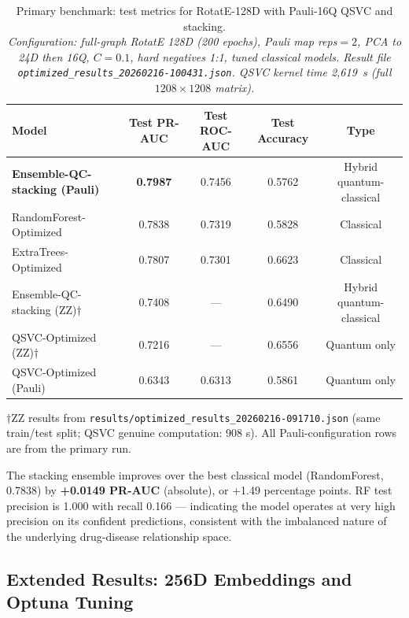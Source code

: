 \documentclass[twocolumn,10pt]{article}
\begin{document}
\begin{table}[t]
\centering
\caption{Primary benchmark: test metrics for RotatE-128D with Pauli-16Q QSVC and stacking.\protect\\
\small\textit{Configuration: full-graph RotatE 128D (200 epochs), Pauli map reps${=}2$, PCA to 24D then 16Q, $C{=}0.1$, hard negatives 1:1, tuned classical models. Result file \texttt{optimized\_results\_20260216-100431.json}. QSVC kernel time 2,619~s (full $1208{\times}1208$ matrix).}}
\label{tab:primary}
\begin{tabular}{@{}lcccc@{}}
\toprule
\textbf{Model} & \textbf{Test PR-AUC} & \textbf{Test ROC-AUC} & \textbf{Test Accuracy} & \textbf{Type} \\
\midrule
\textbf{Ensemble-QC-stacking (Pauli)} & \textbf{0.7987} & 0.7456 & 0.5762 & Hybrid quantum-classical \\
RandomForest-Optimized & 0.7838 & 0.7319 & 0.5828 & Classical \\
ExtraTrees-Optimized & 0.7807 & 0.7301 & 0.6623 & Classical \\
Ensemble-QC-stacking (ZZ)$\dagger$ & 0.7408 & --- & 0.6490 & Hybrid quantum-classical \\
QSVC-Optimized (ZZ)$\dagger$ & 0.7216 & --- & 0.6556 & Quantum only \\
QSVC-Optimized (Pauli) & 0.6343 & 0.6313 & 0.5861 & Quantum only \\
\bottomrule
\end{tabular}

\smallskip
\begin{minipage}{\linewidth}
\small $\dagger$ZZ results from \texttt{results/optimized\_results\_20260216-091710.json} (same train/test split; QSVC genuine computation: 908 s). All Pauli-configuration rows are from the primary run.
\end{minipage}
\end{table}

The stacking ensemble improves over the best classical model (RandomForest, 0.7838) by \textbf{+0.0149 PR-AUC} (absolute), or +1.49 percentage points. RF test precision is 1.000 with recall 0.166 --- indicating the model operates at very high precision on its confident predictions, consistent with the imbalanced nature of the underlying drug-disease relationship space.

\FloatBarrier
\subsection{Extended Results: 256D Embeddings and Optuna Tuning}
\end{document}
